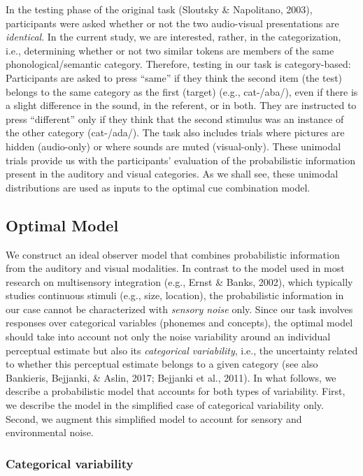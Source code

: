 \documentclass[english,,man,floatsintext]{apa6}
\theoremstyle{definition}
\theoremstyle{definition}
\theoremstyle{definition}
\theoremstyle{remark}
\begin{document}
In the testing phase of the original task (Sloutsky \& Napolitano,
2003), participants were asked whether or not the two audio-visual
presentations are \emph{identical}. In the current study, we are
interested, rather, in the categorization, i.e., determining whether or
not two similar tokens are members of the same phonological/semantic
category. Therefore, testing in our task is category-based: Participants
are asked to press \enquote{same} if they think the second item (the
test) belongs to the same category as the first (target) (e.g.,
cat-/aba/), even if there is a slight difference in the sound, in the
referent, or in both. They are instructed to press \enquote{different}
only if they think that the second stimulus was an instance of the other
category (cat-/ada/). The task also includes trials where pictures are
hidden (audio-only) or where sounds are muted (visual-only). These
unimodal trials provide us with the participants' evaluation of the
probabilistic information present in the auditory and visual categories.
As we shall see, these unimodal distributions are used as inputs to the
optimal cue combination model.

\subsection{Optimal Model}\label{optimal-model}

We construct an ideal observer model that combines probabilistic
information from the auditory and visual modalities. In contrast to the
model used in most research on multisensory integration (e.g., Ernst \&
Banks, 2002), which typically studies continuous stimuli (e.g., size,
location), the probabilistic information in our case cannot be
characterized with \emph{sensory noise} only. Since our task involves
responses over categorical variables (phonemes and concepts), the
optimal model should take into account not only the noise variability
around an individual perceptual estimate but also its \emph{categorical
variability}, i.e., the uncertainty related to whether this perceptual
estimate belongs to a given category (see also Bankieris, Bejjanki, \&
Aslin, 2017; Bejjanki et al., 2011). In what follows, we describe a
probabilistic model that accounts for both types of variability. First,
we describe the model in the simplified case of categorical variability
only. Second, we augment this simplified model to account for sensory
and environmental noise.

\subsubsection{Categorical variability}\label{categorical-variability}
\end{document}
